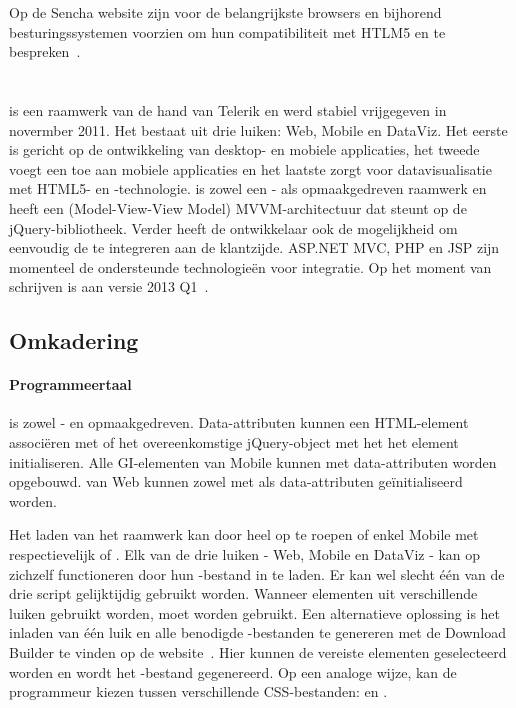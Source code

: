 Op de Sencha website zijn voor de belangrijkste browsers en bijhorend besturingssystemen  voorzien om hun compatibiliteit met HTLM5 en \st{} te bespreken~\cite{Inc.}.


\section{\kendo}
\label{sec:raamwerk-kendo}
\kendo{} is een raamwerk van de hand van Telerik en werd stabiel vrijgegeven in novermber 2011.
Het bestaat uit drie luiken:  Web, Mobile en DataViz.  
Het eerste is gericht op de ontwikkeling van desktop- en mobiele applicaties,  het tweede voegt een  toe aan mobiele applicaties en het laatste zorgt voor datavisualisatie met HTML5- en \js{}-technologie.
\kendo{} is zowel een \js{}- als opmaakgedreven raamwerk en heeft een (Model-View-View Model) MVVM-architectuur dat steunt op de jQuery-bibliotheek.
Verder heeft de ontwikkelaar ook de mogelijkheid om eenvoudig de  te integreren aan de klantzijde.
ASP.NET MVC,  PHP en JSP zijn momenteel de ondersteunde technologieën voor integratie.
Op het moment van schrijven is \kendo{} aan versie 2013 Q1~\cite{Telerik}. 

\subsection{Omkadering}
\label{sec:kendo-omkadering}

\paragraph{Programmeertaal}
\kendo{} is zowel \js{}- en opmaakgedreven. 
Data-attributen kunnen een HTML-element associëren met \kendo{} of het overeenkomstige jQuery-object met \js{} het het element initialiseren.
Alle GI-elementen van \kendo{} Mobile kunnen met data-attributen worden opgebouwd.
 van \kendo{} Web kunnen zowel met \js{} als data-attributen geïnitialiseerd worden.

Het laden van het raamwerk kan door heel \kendo{} op te roepen of enkel \kendo{} Mobile met respectievelijk  of .
Elk van de drie luiken - Web, Mobile en DataViz - kan op zichzelf functioneren door hun \js{}-bestand in te laden.
Er kan wel slecht één van de drie script gelijktijdig gebruikt worden.  
Wanneer elementen uit verschillende luiken gebruikt worden, moet  worden gebruikt.
Een alternatieve oplossing is het inladen van één luik en alle benodigde \js{}-bestanden te genereren met de \js{} Download Builder te vinden op de \kendo{} website~\cite{Telerike}.
Hier kunnen de vereiste elementen geselecteerd worden en wordt het \js{}-bestand gegenereerd.
Op een analoge wijze, kan de programmeur kiezen tussen verschillende CSS-bestanden:   en .

